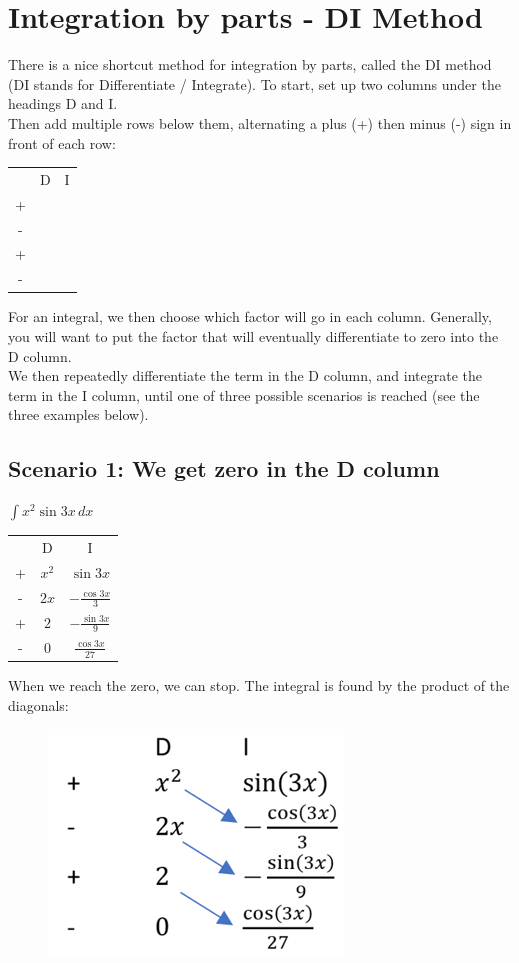 \documentclass[../main.tex]{subfiles}
\begin{document}
\section{Integration by parts - DI Method}
There is a nice shortcut method for integration by parts, called the DI method (DI stands for Differentiate / Integrate).
To start, set up two columns under the headings D and I. \\

Then add multiple rows below them, alternating a plus (+) then minus (-) sign in front of each row:\\

\begin{tabular}{ c c c }
   & D & I \\ 
 + &  &  \\  
 - &  & \\
  + &  &  \\  
 - &  & \\
\end{tabular}

For an integral, we then choose which factor will go in each column. Generally, you will want to put the factor that will eventually differentiate to zero into the D column.\\

We then repeatedly differentiate the term in the D column, and integrate the term in the I column, until one of three possible scenarios is reached (see the three examples below).\\

\subsection*{Scenario 1: We get zero in the D column}
\(\int x^2 \sin{3x}\, dx\)\\

\begin{tabular}{ c c c }
   & D & I \\ 
 +  & $x^2$ &$\sin{3x}$ \\  
 - & $2x$ & $-\frac{\cos{3x}}{3}$\\
  + & $2$ & $-\frac{\sin{3x}}{9}$ \\  
 - & $0$ & $\frac{\cos{3x}}{27}$\\
\end{tabular}

When we reach the zero, we can stop. The integral is found by the product of the diagonals:\\
\begin{figure}[h]
    
    \includegraphics[width=0.22\linewidth]{images/dimethod1.png}
\end{figure}
\end{document}
